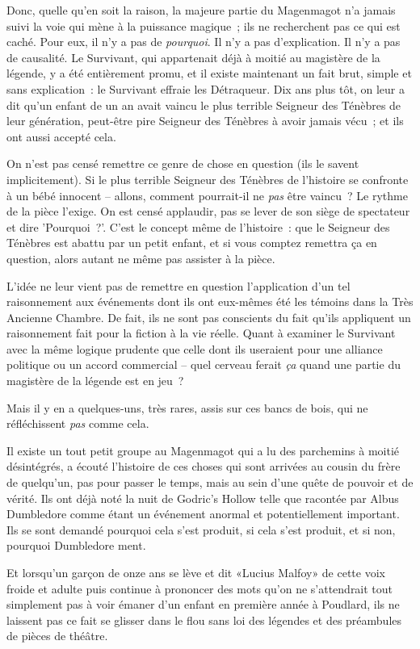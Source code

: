 Donc, quelle qu'en soit la raison, la majeure partie du Magenmagot n'a jamais suivi la voie qui mène à la puissance magique~; ils ne recherchent pas ce qui est caché. Pour eux, il n'y a pas de \emph{pourquoi}. Il n'y a pas d'explication. Il n'y a pas de causalité. Le Survivant, qui appartenait déjà à moitié au magistère de la légende, y a été entièrement promu, et il existe maintenant un fait brut, simple et sans explication~: le Survivant effraie les Détraqueur. Dix ans plus tôt, on leur a dit qu'un enfant de un an avait vaincu le plus terrible Seigneur des Ténèbres de leur génération, peut-être pire Seigneur des Ténèbres à avoir jamais vécu~; et ils ont aussi accepté cela.

On n'est pas censé remettre ce genre de chose en question (ils le savent implicitement). Si le plus terrible Seigneur des Ténèbres de l'histoire se confronte à un bébé innocent -- allons, comment pourrait-il ne \emph{pas} être vaincu~? Le rythme de la pièce l'exige. On est censé applaudir, pas se lever de son siège de spectateur et dire 'Pourquoi~?'. C'est le concept même de l'histoire~: que le Seigneur des Ténèbres est abattu par un petit enfant, et si vous comptez remettra ça en question, alors autant ne même pas assister à la pièce.

L'idée ne leur vient pas de remettre en question l'application d'un tel raisonnement aux événements dont ils ont eux-mêmes été les témoins dans la Très Ancienne Chambre. De fait, ils ne sont pas conscients du fait qu'ils appliquent un raisonnement fait pour la fiction à la vie réelle. Quant à examiner le Survivant avec la même logique prudente que celle dont ils useraient pour une alliance politique ou un accord commercial -- quel cerveau ferait \emph{ça} quand une partie du magistère de la légende est en jeu~?

Mais il y en a quelques-uns, très rares, assis sur ces bancs de bois, qui ne réfléchissent \emph{pas} comme cela.

Il existe un tout petit groupe au Magenmagot qui a lu des parchemins à moitié désintégrés, a écouté l'histoire de ces choses qui sont arrivées au cousin du frère de quelqu'un, pas pour passer le temps, mais au sein d'une quête de pouvoir et de vérité. Ils ont déjà noté la nuit de Godric's Hollow telle que racontée par Albus Dumbledore comme étant un événement anormal et potentiellement important. Ils se sont demandé pourquoi cela s'est produit, si cela s'est produit, et si non, pourquoi Dumbledore ment.

Et lorsqu'un garçon de onze ans se lève et dit «Lucius Malfoy» de cette voix froide et adulte puis continue à prononcer des mots qu'on ne s'attendrait tout simplement pas à voir émaner d'un enfant en première année à Poudlard, ils ne laissent pas ce fait se glisser dans le flou sans loi des légendes et des préambules de pièces de théâtre.

